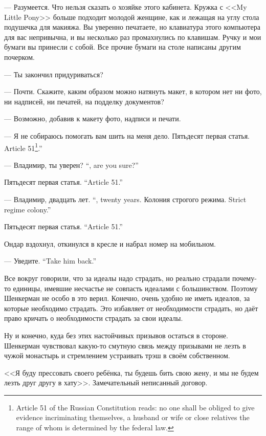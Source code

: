 --- Разумеется.
Что нельзя сказать о хозяйке этого кабинета.
Кружка с <<My Little Pony>> больше подходит молодой женщине, как и лежащая на углу стола подушечка для макияжа.
Вы уверенно печатаете, но клавиатура этого компьютера для вас непривычна, и вы несколько раз промахнулись по клавишам.
Ручку и мои бумаги вы принесли с собой.
Все прочие бумаги на столе написаны другим почерком.

--- Ты закончил придуриваться?

--- Почти.
Скажите, каким образом можно натянуть макет, в котором нет ни фото, ни надписей, ни печатей, на подделку документов?

--- Возможно, добавив к макету фото, надписи и печати.

--- Я не собираюсь помогать вам шить на меня дело.
{Пятьдесят первая статья.}
{Article 51\footnote{Article 51 of the Russian Constitution reads: no one shall be obliged to give evidence incriminating themselves, a husband or wife or close relatives the range of whom is determined by the federal law.}.''}

{--- Владимир, ты уверен?}
{``\Vladimir, are you sure?''}

{Пятьдесят первая статья.}
{``Article 51.''}

{--- Владимир, двадцать лет.}
{``\Vladimir, twenty years.}
{Колония строгого режима.}
{Strict regime colony.''}

{Пятьдесят первая статья.}
{``Article 51.''}

Ондар вздохнул, откинулся в кресле и набрал номер на мобильном.

{--- Уведите.}
{``Take him back.''}

\asterism

\textspace

Все вокруг говорили, что за идеалы надо страдать, но реально страдали почему-то единицы, имевшие несчастье не совпасть идеалами с большинством.
Поэтому Шенкерман не особо в это верил.
Конечно, очень удобно не иметь идеалов, за которые необходимо страдать.
Это избавляет от необходимости страдать, но даёт право кричать о необходимости страдать за свои идеалы.

Ну и конечно, куда без этих настойчивых призывов остаться в стороне.
Шенкерман чувствовал какую-то смутную связь между призывами не лезть в чужой монастырь и стремлением устраивать трэш в своём собственном.

<<Я буду прессовать своего ребёнка, ты будешь бить свою жену, и мы не будем лезть друг другу в хату>>.
Замечательный неписанный договор.

